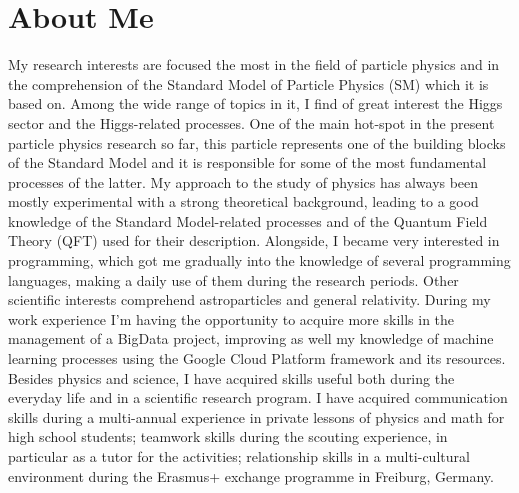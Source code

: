 \documentclass[11pt,a4paper,roman]{moderncv}        %
\begin{document}
\section{About Me}
My research interests are focused the most in the field of particle physics and in the comprehension of the Standard Model of Particle Physics (SM) which it is based on. Among the wide range of topics in it, I find of great interest the Higgs sector and the Higgs-related processes. One of the main hot-spot in the present particle physics research so far, this particle represents one of the building blocks of the Standard Model and it is responsible for some of the most fundamental processes of the latter. My approach to the study of physics has always been mostly experimental with a strong theoretical background, leading to a good knowledge of the Standard Model-related processes and of the Quantum Field Theory (QFT) used for their description. Alongside, I became very interested in programming, which got me gradually into the knowledge of several programming languages, making a daily use of them during the research periods. Other scientific interests comprehend astroparticles and general relativity. During my work experience I'm having the opportunity to acquire more skills in the management of a BigData project, improving as well my knowledge of machine learning processes using the Google Cloud Platform framework and its resources. Besides physics and science, I have acquired skills useful both during the everyday life and in a scientific research program. I have acquired communication skills during a multi-annual experience in private lessons of physics and math for high school students; teamwork skills during the scouting experience, in particular as a tutor for the activities; relationship skills in a multi-cultural environment during the Erasmus+ exchange programme in Freiburg, Germany.
\end{document}
